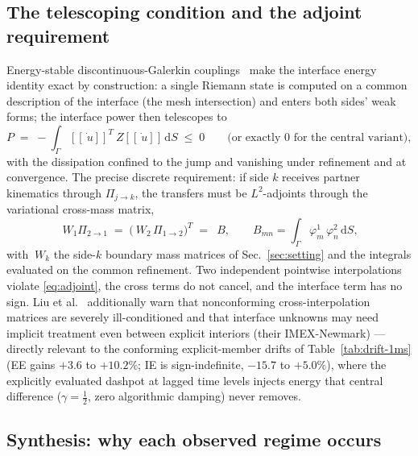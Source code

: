 \documentclass[11pt]{article}
\newcommand{\dd}{\mathrm{d}}
\newcommand{\jump}[1]{[\![#1]\!]}
\begin{document}
\subsection{The telescoping condition and the adjoint requirement}
\label{sec:telescoping}

Energy-stable discontinuous-Galerkin
couplings~\cite{AppeloWang2019,DuruEtAl2021,LiuEtAl2023} make the interface
energy identity exact by construction: a single Riemann state is computed on a common
description of the interface (the mesh intersection) and enters both sides'
weak forms; the interface power then telescopes to
\begin{equation}
  P \;=\; -\int_\Gamma \jump{\dot{~u}}^T ~Z \jump{\dot{~u}} \,\dd S
  \;\le\; 0
  \qquad\text{(or exactly } 0 \text{ for the central variant)},
  \label{eq:telescope}
\end{equation}
with the dissipation confined to the jump and vanishing under refinement
and at convergence. The precise discrete requirement: if side $k$ receives
partner kinematics through $\Pi_{j\to k}$, the transfers must be
$L^2$-adjoints through the variational cross-mass matrix,
\begin{equation}
  ~W_1 \Pi_{2\to1} \;=\; \bigl(~W_2\,\Pi_{1\to2}\bigr)^{T} \;=\; ~B,
  \qquad
  B_{mn} = \int_\Gamma \varphi^1_m\,\varphi^2_n \,\dd S,
  \label{eq:adjoint}
\end{equation}
with $~W_k$ the side-$k$ boundary mass matrices of Sec.~\ref{sec:setting}
and the integrals evaluated on the common refinement. Two independent
pointwise interpolations violate \eqref{eq:adjoint}, the cross terms do not
cancel, and the interface term has no sign. Liu et
al.~\cite{LiuEtAl2023} additionally warn that nonconforming
cross-interpolation matrices are severely ill-conditioned and that interface
unknowns may need implicit treatment even between explicit interiors (their
IMEX-Newmark) --- directly relevant to the conforming explicit-member
drifts of Table~\ref{tab:drift-1ms} (EE gains $+3.6$ to $+10.2\%$; IE is
sign-indefinite, $-15.7$ to $+5.0\%$), where the explicitly evaluated
dashpot at lagged time levels injects energy that central difference
($\gamma = \tfrac12$, zero algorithmic damping) never removes.

\subsection{Synthesis: why each observed regime occurs}
\label{sec:synthesis}
\end{document}
